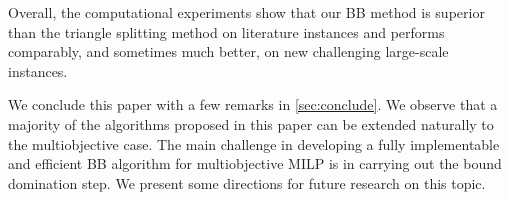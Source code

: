 \documentclass[11.5pt]{article}
\newcommand{\bb}{BB}
\newcommand{\comment}[1]{{\color{red} #1}}
\begin{document}
Overall, the computational experiments show that our \bb{} method is superior than the triangle splitting method on literature instances and performs comparably, and sometimes much better, on new challenging large-scale instances.


We conclude this paper with a few remarks in \textsection\ref{sec:conclude}. %
We observe that a majority of the algorithms proposed in this paper can be extended naturally to the multiobjective case. The main challenge in developing a fully implementable and efficient \bb{} algorithm for multiobjective MILP is in carrying out the bound domination step. We present some directions for future research on this topic.
\end{document}
